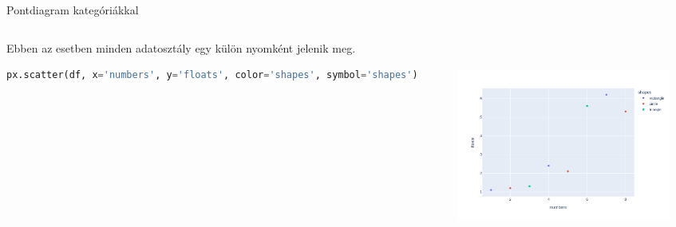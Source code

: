 \documentclass[english, aspectratio=169]{beamer}
\begin{document}
	\begin{frame}[fragile]{Pontdiagram kategóriákkal}
		\begin{columns}
			\begin{column}{.5\textwidth}
				Ebben az esetben minden adatosztály egy külön nyomként jelenik meg. 
				\vspace{0.3cm}
				\begin{lstlisting}[language=python]
px.scatter(df, x='numbers', y='floats', color='shapes', symbol='shapes')
				\end{lstlisting}
			\end{column}
			\begin{column}{.5\textwidth}
				\begin{center}
					\includegraphics[width=7cm, height=7cm, keepaspectratio]{images/plots_9.png}
				\end{center}
			\end{column}
		\end{columns}
	\end{frame}
	
\end{document}
